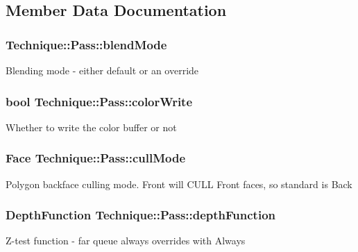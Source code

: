 \subsection{Member Data Documentation}
\subsubsection[{\texorpdfstring{blend\+Mode}{blendMode}}]{ Technique\+::\+Pass\+::blend\+Mode}\hypertarget{classTechnique_1_1Pass_a8ee535e18674a4fb16678238272447f5}{}\label{classTechnique_1_1Pass_a8ee535e18674a4fb16678238272447f5}
Blending mode -\/ either default or an override 
\subsubsection[{\texorpdfstring{color\+Write}{colorWrite}}]{\setlength{\rightskip}{0pt plus 5cm}bool Technique\+::\+Pass\+::color\+Write}\hypertarget{classTechnique_1_1Pass_a3e71850801dfab821b904dd1069cb3f9}{}\label{classTechnique_1_1Pass_a3e71850801dfab821b904dd1069cb3f9}
Whether to write the color buffer or not 
\subsubsection[{\texorpdfstring{cull\+Mode}{cullMode}}]{\setlength{\rightskip}{0pt plus 5cm}Face Technique\+::\+Pass\+::cull\+Mode}\hypertarget{classTechnique_1_1Pass_a8732559ebb9bac891dee8bf918637863}{}\label{classTechnique_1_1Pass_a8732559ebb9bac891dee8bf918637863}
Polygon backface culling mode.  Front will C\+U\+LL Front faces, so standard is Back 
\subsubsection[{\texorpdfstring{depth\+Function}{depthFunction}}]{\setlength{\rightskip}{0pt plus 5cm}Depth\+Function Technique\+::\+Pass\+::depth\+Function}\hypertarget{classTechnique_1_1Pass_ae6c3934149bfb4d791fda507900644c4}{}\label{classTechnique_1_1Pass_ae6c3934149bfb4d791fda507900644c4}
Z-\/test function -\/ far queue always overrides with Always 

